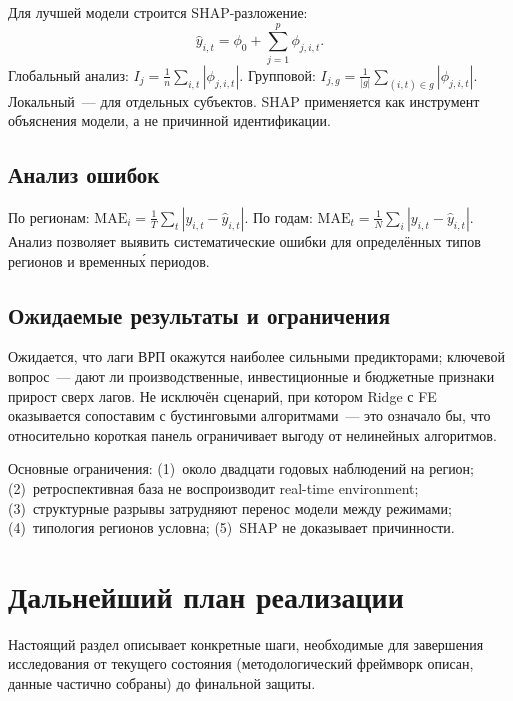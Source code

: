 \documentclass[12pt,a4paper]{article}
\begin{document}
Для лучшей модели строится SHAP-разложение:
\begin{equation}
  \hat{y}_{i,t} = \phi_0 + \sum_{j=1}^{p} \phi_{j,i,t}.
\end{equation}
Глобальный анализ: $I_j = \frac{1}{n}\sum_{i,t}|\phi_{j,i,t}|$.
Групповой: $I_{j,g} = \frac{1}{|g|}\sum_{(i,t)\in g}|\phi_{j,i,t}|$.
Локальный~--- для отдельных субъектов. SHAP применяется как инструмент
объяснения модели, а не причинной идентификации.

\subsection{Анализ ошибок}

По регионам: $\mathrm{MAE}_i = \frac{1}{T}\sum_t|y_{i,t}-\hat{y}_{i,t}|$.
По годам: $\mathrm{MAE}_t = \frac{1}{N}\sum_i|y_{i,t}-\hat{y}_{i,t}|$.
Анализ позволяет выявить систематические ошибки для определённых типов
регионов и временны\'{х} периодов.

\subsection{Ожидаемые результаты и ограничения}

Ожидается, что лаги ВРП окажутся наиболее сильными предикторами; ключевой
вопрос~--- дают ли производственные, инвестиционные и бюджетные признаки
прирост сверх лагов. Не исключён сценарий, при котором Ridge с FE оказывается
сопоставим с бустинговыми алгоритмами~--- это означало бы, что относительно
короткая панель ограничивает выгоду от нелинейных алгоритмов.

Основные ограничения: (1)~около двадцати годовых наблюдений на регион;
(2)~ретроспективная база не воспроизводит real-time environment;
(3)~структурные разрывы затрудняют перенос модели между режимами;
(4)~типология регионов условна; (5)~SHAP не доказывает причинности.

\section{Дальнейший план реализации}

Настоящий раздел описывает конкретные шаги, необходимые для завершения
исследования от текущего состояния (методологический фреймворк описан,
данные частично собраны) до финальной защиты.
\end{document}
